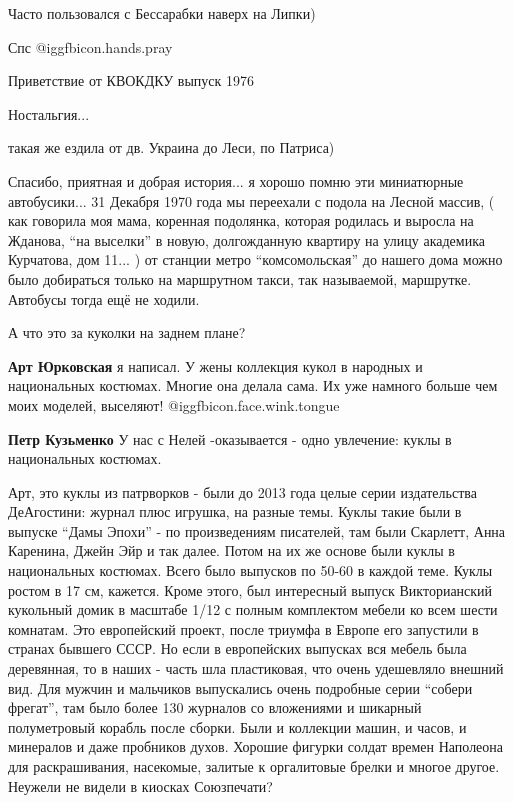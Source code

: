 \begin{itemize}
Часто пользовался с Бессарабки наверх на Липки)

Спс  @igg{fbicon.hands.pray} 

Приветствие от КВОКДКУ выпуск 1976

Ностальгия...

такая же ездила от дв. Украина до Леси, по Патриса)


Спасибо, приятная и добрая история... я хорошо помню эти миниатюрные автобусики...
31 Декабря 1970 года мы переехали с подола на Лесной массив, ( как говорила моя
мама, коренная подолянка, которая родилась и выросла на Жданова, \enquote{на выселки} в
новую, долгожданную квартиру на улицу академика Курчатова, дом 11... ) от станции
метро \enquote{комсомольская} до нашего дома можно было добираться только на
маршрутном такси, так называемой, маршрутке. Автобусы тогда ещё не ходили.


А что это за куколки на заднем плане?

\begin{itemize} %
\textbf{Арт Юрковская} я написал. У жены коллекция кукол в народных и национальных костюмах. Многие она делала сама. Их уже намного больше чем моих моделей, выселяют! @igg{fbicon.face.wink.tongue} 

\textbf{Петр Кузьменко} У нас с Нелей -оказывается - одно увлечение: куклы в национальных костюмах.


Арт, это куклы из патрворков - были до 2013 года целые серии издательства
ДеАгостини: журнал плюс игрушка, на разные темы. Куклы такие были в выпуске
\enquote{Дамы Эпохи} - по произведениям писателей, там были Скарлетт, Анна Каренина,
Джейн Эйр и так далее. Потом на их же основе были куклы в национальных
костюмах. Всего было выпусков по 50-60 в каждой теме. Куклы ростом в 17 см,
кажется. Кроме этого, был интересный выпуск Викторианский кукольный домик в
масштабе 1/12 с полным комплектом мебели ко всем шести комнатам. Это
европейский проект, после триумфа в Европе его запустили в странах бывшего
СССР. Но если в европейских выпусках вся мебель была деревянная, то в наших -
часть шла пластиковая, что очень удешевляло внешний вид. Для мужчин и мальчиков
выпускались очень подробные серии \enquote{собери фрегат}, там было более 130 журналов
со вложениями и шикарный полуметровый корабль после сборки. Были и коллекции
машин, и часов, и минералов и даже пробников духов. Хорошие фигурки солдат
времен Наполеона для раскрашивания, насекомые, залитые к оргалитовые брелки и
многое другое. Неужели не видели в киосках Союзпечати?


\end{itemize}
\end{itemize}

